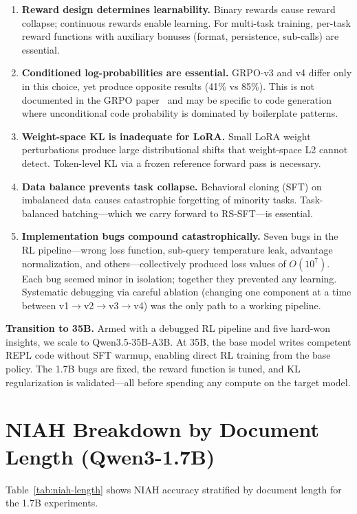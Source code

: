 \documentclass{article}
\begin{document}
\begin{enumerate}
    \item \textbf{Reward design determines learnability.} Binary rewards cause reward collapse; continuous rewards enable learning. For multi-task training, per-task reward functions with auxiliary bonuses (format, persistence, sub-calls) are essential.
    \item \textbf{Conditioned log-probabilities are essential.} GRPO-v3 and v4 differ only in this choice, yet produce opposite results (41\% vs 85\%). This is not documented in the GRPO paper~\cite{deepseekr1} and may be specific to code generation where unconditional code probability is dominated by boilerplate patterns.
    \item \textbf{Weight-space KL is inadequate for LoRA.} Small LoRA weight perturbations produce large distributional shifts that weight-space L2 cannot detect. Token-level KL via a frozen reference forward pass is necessary.
    \item \textbf{Data balance prevents task collapse.} Behavioral cloning (SFT) on imbalanced data causes catastrophic forgetting of minority tasks. Task-balanced batching---which we carry forward to RS-SFT---is essential.
    \item \textbf{Implementation bugs compound catastrophically.} Seven bugs in the RL pipeline---wrong loss function, sub-query temperature leak, advantage normalization, and others---collectively produced loss values of $O(10^7)$. Each bug seemed minor in isolation; together they prevented any learning. Systematic debugging via careful ablation (changing one component at a time between v1$\to$v2$\to$v3$\to$v4) was the only path to a working pipeline.
\end{enumerate}

\textbf{Transition to 35B.} Armed with a debugged RL pipeline and five hard-won insights, we scale to Qwen3.5-35B-A3B. At 35B, the base model writes competent REPL code without SFT warmup, enabling direct RL training from the base policy. The 1.7B bugs are fixed, the reward function is tuned, and KL regularization is validated---all before spending any compute on the target model.

\section{NIAH Breakdown by Document Length (Qwen3-1.7B)}
\label{app:niah-breakdown}

Table~\ref{tab:niah-length} shows NIAH accuracy stratified by document length for the 1.7B experiments.
\end{document}
